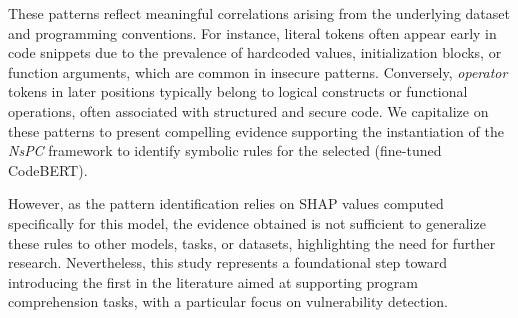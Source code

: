 These patterns reflect meaningful correlations arising from the underlying dataset and programming conventions. For instance, literal tokens often appear early in code snippets due to the prevalence of hardcoded values, initialization blocks, or function arguments, which are common in insecure patterns. Conversely, \textit{operator} tokens in later positions typically belong to logical constructs or functional operations, often associated with structured and secure code. 
We capitalize on these patterns to present compelling evidence supporting the instantiation of the \emph{NsPC} framework to identify symbolic rules for the selected \lcm (\ie fine-tuned CodeBERT).




However, as the pattern identification relies on SHAP values computed specifically for this model, the evidence obtained is not sufficient to generalize these rules to other models, tasks, or datasets, highlighting the need for further research. Nevertheless, this study represents a foundational step toward introducing the first \framework in the literature aimed at supporting program comprehension tasks, with a particular focus on vulnerability detection.

